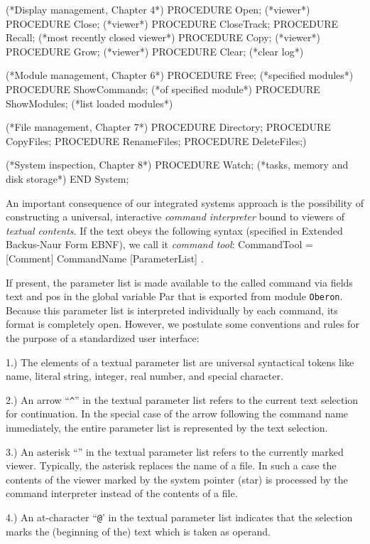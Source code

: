 (*Display management, Chapter 4*)
  PROCEDURE Open; (*viewer*)
  PROCEDURE Close; (*viewer*)
  PROCEDURE CloseTrack;
  PROCEDURE Recall; (*most recently closed viewer*)
  PROCEDURE Copy; (*viewer*)
  PROCEDURE Grow; (*viewer*)
  PROCEDURE Clear; (*clear log*)
  
(*Module management, Chapter 6*)
  PROCEDURE Free; (*specified modules*)
  PROCEDURE ShowCommands; (*of specified module*)
  PROCEDURE ShowModules; (*list loaded modules*)
  
(*File management, Chapter 7*)
  PROCEDURE Directory;
  PROCEDURE CopyFiles;
  PROCEDURE RenameFiles;
  PROCEDURE DeleteFiles;)
  
(*System inspection, Chapter 8*)
  PROCEDURE Watch; (*tasks, memory and disk storage*)
END System;
\endtt

\noindent An important consequence of our integrated systems approach is the
possibility of constructing a universal, interactive 
{\it command interpreter\/} bound to viewers of {\it textual contents\/}. If the text obeys
the following syntax (specified in Extended Backus-Naur Form EBNF), we
call it {\it command tool\/}:
\begintt
CommandTool = { [Comment] CommandName [ParameterList] }.
\endtt

\noindent If present, the parameter list is made available to the called command
via fields text and pos in the global variable Par that is exported
from module {\tt Oberon\/}. Because this parameter list is interpreted
individually by each command, its format is completely open. However,
we postulate some conventions and rules for the purpose of a
standardized user interface:

1.) The elements of a textual parameter list are universal syntactical tokens like name, literal string, integer, real number, and special character.

2.) An arrow ``{\tt \^\/}'' in the textual parameter list refers to the current text selection for continuation. In the special case of the arrow following the command name immediately, the entire parameter list is represented by the text selection.

3.) An asterisk ``{\tt *}'' in the textual parameter list refers to the currently marked viewer. Typically, the asterisk replaces the name of a file. In such a case the contents of the viewer marked by the system pointer (star) is processed by the command interpreter instead of the contents of a file.

4.) An at-character ``{\tt @}' in the textual parameter list indicates that the selection marks the (beginning of the) text which is taken as operand.

